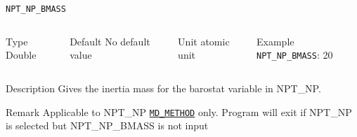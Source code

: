 \begin{frame}[allowframebreaks]{\texttt{NPT\_NP\_BMASS}} \label{NPT_NP_BMASS}
\vspace*{-12pt}
\begin{columns}
\begin{block}{Type}
Double
\end{block}

\begin{block}{Default}
No default value
\end{block}

\begin{block}{Unit}
atomic unit
\end{block}

\begin{block}{Example}
\texttt{NPT\_NP\_BMASS}: 20
\end{block}
\end{columns}

\begin{block}{Description}
Gives the inertia mass for the barostat variable in NPT\_NP.
\end{block}

\begin{block}{Remark}
Applicable to NPT\_NP \hyperlink{MD_METHOD}{\texttt{MD\_METHOD}} only.
Program will exit if NPT\_NP is selected but NPT\_NP\_BMASS is not input
\end{block}

\end{frame}



